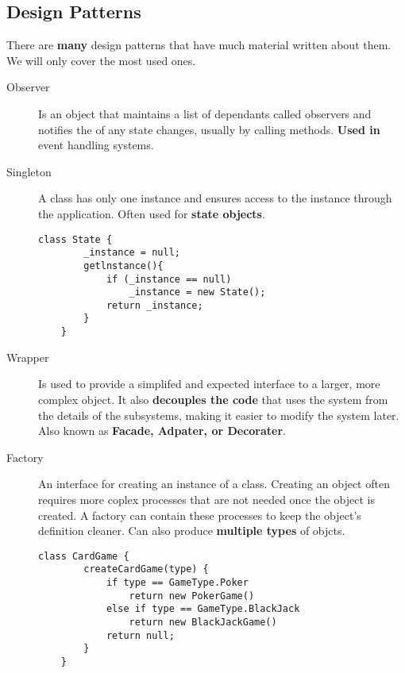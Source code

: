 \documentclass{article}
\begin{document}
	\subsection{Design Patterns}
		There are {\bf many} design patterns that have much material written about them. We will only cover the most used ones.
		\begin{description}
			\item[Observer] Is an object that maintains a list of dependants called observers and notifies the of any state changes, usually by calling methods. {\bf Used in} event handling systems.

			\item[Singleton] A class has only one instance and ensures access to the instance through the application. Often used for {\bf state objects}. \par
				\begin{lstlisting}[style=pseudo]
	class State {
		_instance = null;
		getlnstance(){
			if (_instance == null)
				_instance = new State();
			return _instance;
		}
	}
				\end{lstlisting}

			\item[Wrapper] Is used to provide a simplifed and expected interface to a larger, more complex object. It also {\bf decouples the code} that uses the system from the details of the subsystems, making it easier to modify the system later. Also known as {\bf Facade, Adpater, or Decorater}.

			\item[Factory] An interface for creating an instance of a class. Creating an object often requires more coplex processes that are not needed once the   object is created. A factory can contain these processes to keep the object's definition cleaner. Can also produce {\bf multiple types} of objcts. \par
				\begin{lstlisting}[style=pseudo]
	class CardGame {
		createCardGame(type) {
			if type == GameType.Poker
				return new PokerGame()
			else if type == GameType.BlackJack
				return new BlackJackGame()
			return null;
		}
	}
				\end{lstlisting}

		\end{description}
\end{document}
